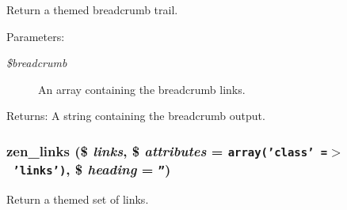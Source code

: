 Return a themed breadcrumb trail.

\begin{Desc}
\item[Parameters:]
\begin{description}
\item[{\em \$breadcrumb}]An array containing the breadcrumb links. \end{description}
\end{Desc}
\begin{Desc}
\item[Returns:]A string containing the breadcrumb output. \end{Desc}
\hypertarget{sites_2all_2themes_2zen_2template_8php_acdeb97b225d8fd386a9bded28eb762c}{
\subsubsection[{zen\_\-links}]{\setlength{\rightskip}{0pt plus 5cm}zen\_\-links (\$ {\em links}, \/  \$ {\em attributes} = {\tt array('class'~=$>$~'links')}, \/  \$ {\em heading} = {\tt ''})}}
\label{sites_2all_2themes_2zen_2template_8php_acdeb97b225d8fd386a9bded28eb762c}


Return a themed set of links.

